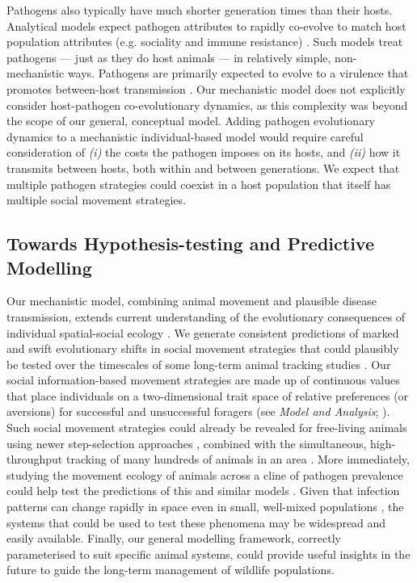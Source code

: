 Pathogens also typically have much shorter generation times than their hosts.
Analytical models expect pathogen attributes to rapidly co-evolve to match host population attributes (e.g. sociality and immune resistance) \citep[][]{bonds2005,prado2009,ashby2022}.
Such models treat pathogens --- just as they do host animals --- in relatively simple, non-mechanistic ways.
Pathogens are primarily expected to evolve to a virulence that promotes between-host transmission \citep{bonds2005}.
Our mechanistic model does not explicitly consider host-pathogen co-evolutionary dynamics, as this complexity was beyond the scope of our general, conceptual model.
Adding pathogen evolutionary dynamics to a mechanistic individual-based model would require careful consideration of \textit{(i)} the costs the pathogen imposes on its hosts, and \textit{(ii)} how it transmits between hosts, both within and between generations.
We expect that multiple pathogen strategies could coexist in a host population that itself has multiple social movement strategies.

\subsection*{Towards Hypothesis-testing and Predictive Modelling}

Our mechanistic model, combining animal movement and plausible disease transmission, extends current understanding of the evolutionary consequences of individual spatial-social ecology \citep{webber2018,albery2021,webber2022}.
We generate consistent predictions of marked and swift evolutionary shifts in social movement strategies that could plausibly be tested over the timescales of some long-term animal tracking studies \citep{wilber2022}.
Our social information-based movement strategies are made up of continuous values that place individuals on a two-dimensional trait space of relative preferences (or aversions) for successful and unsuccessful foragers (see \textit{Model and Analysis}; \cite{bastille-rousseau2019}).
Such social movement strategies could already be revealed for free-living animals using newer step-selection approaches \citep{avgar2016}, combined with the simultaneous, high-throughput tracking of many hundreds of animals in an area \citep{nathan2022}.
More immediately, studying the movement ecology of animals across a cline of pathogen prevalence could help test the predictions of this and similar models \citep{wilber2022}.
Given that infection patterns can change rapidly in space even in small, well-mixed populations \citep{albery2022}, the systems that could be used to test these phenomena may be widespread and easily available.
Finally, our general modelling framework, correctly parameterised to suit specific animal systems, could provide useful insights in the future to guide the long-term management of wildlife populations.


